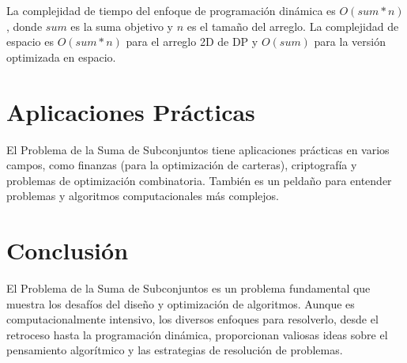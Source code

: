 \documentclass{article}
\begin{document}
La complejidad de tiempo del enfoque de programación dinámica es \( O(sum * n) \), donde \( sum \) es la suma objetivo y \( n \) es el tamaño del arreglo. La complejidad de espacio es \( O(sum * n) \) para el arreglo 2D de DP y \( O(sum) \) para la versión optimizada en espacio.

\section{Aplicaciones Prácticas}
El Problema de la Suma de Subconjuntos tiene aplicaciones prácticas en varios campos, como finanzas (para la optimización de carteras), criptografía y problemas de optimización combinatoria. También es un peldaño para entender problemas y algoritmos computacionales más complejos.

\section{Conclusión}
El Problema de la Suma de Subconjuntos es un problema fundamental que muestra los desafíos del diseño y optimización de algoritmos. Aunque es computacionalmente intensivo, los diversos enfoques para resolverlo, desde el retroceso hasta la programación dinámica, proporcionan valiosas ideas sobre el pensamiento algorítmico y las estrategias de resolución de problemas.
\end{document}
